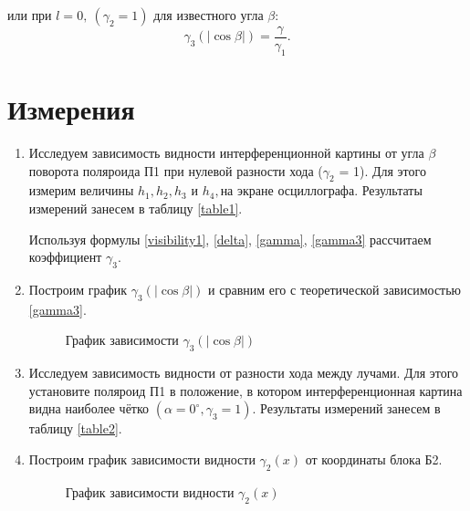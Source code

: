 \documentclass{MagicLabs}
\begin{document}
или при $ l = 0,~(\gamma_2 = 1) $ для известного угла $ \beta $:
\begin{equation}\label{gamma3}
	\gamma_3(|\cos\beta|) = \dfrac{\gamma}{\gamma_1}.
\end{equation}

\section{Измерения}

\begin{enumerate}
	\setcounter{enumi}{0}
	
	\item Исследуем зависимость видности интерференционной картины от угла $ \beta $
	поворота поляроида П1 при нулевой разности хода ($ \gamma_2 $ = 1). Для этого измерим
	величины $ h_1, h_2, h_3 $ и $ h_4, $на экране осциллографа. Результаты измерений занесем
	в таблицу \ref{table1}.
	
	Используя формулы \eqref{visibility1}, \eqref{delta}, \eqref{gamma}, \eqref{gamma3} 
	рассчитаем коэффициент $ \gamma_3 $.

\begin{table}[!h]\centering
	
\end{table}

\item Построим график $ \gamma_3(|\cos\beta|) $ и сравним его с теоретической зависимостью \eqref{gamma3}.

  
\begin{figure}[h!]\centering
	\vspace{-1ex}
	
	\caption{График зависимости $ \gamma_3(|\cos\beta|) $}
\end{figure}

\item Исследуем зависимость видности от разности хода между лучами. Для этого установите поляроид П1 в положение, в котором интерференционная картина видна наиболее чётко 
$ (\alpha=0^\circ, \gamma_3 = 1) $. Результаты измерений занесем
в таблицу \ref{table2}.

\begin{table}[!h]\centering
	
\end{table}

\item Построим график зависимости видности $ \gamma_2(x)  $ от координаты блока Б2.
\newpage

\begin{figure}[h!]\centering
	
	\caption{ График зависимости видности $ \gamma_2(x)  $}
\end{figure}

\end{enumerate}
\end{document}
